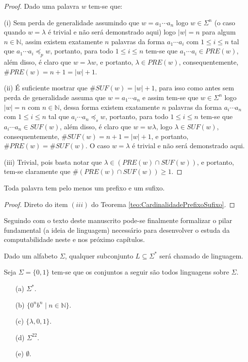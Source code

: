 \begin{proof}
	Dado uma palavra $w$ tem-se que:
	\item[(i)] Sem perda de generalidade assumindo que $w = a_1\cdots a_n$ logo $w \in \Sigma^n$ (o caso quando $w = \lambda$ é trivial e não será demonstrado aqui) logo $|w| = n$ para algum $n \in \mathbb{N}$, assim existem exatamente $n$ palavras da forma $a_1 \cdots a_i$ com $1 \leq i \leq n$ tal que $a_1 \cdots a_i \preceq_p w$, portanto, para todo $1 \leq i \leq n$ tem-se que $a_1 \cdots a_i \in PRE(w)$, além disso, é claro que $w = \lambda w$, e portanto, $\lambda \in PRE(w)$, consequentemente, $\#PRE(w) = n + 1 = |w| + 1$.
	\item[(ii)] É suficiente mostrar que $\# SUF(w) = |w| + 1$, para isso como antes sem perda de generalidade assuma que $w = a_1\cdots a_n$ e assim tem-se que $w \in \Sigma^n$ logo $|w| = n$ com $n \in \mathbb{N}$, dessa forma existem exatamente $n$ palavras da forma $a_i \cdots a_n$ com $1 \leq i \leq n$ tal que $a_i \cdots a_n \preceq_s w$, portanto, para todo $1 \leq i \leq n$ tem-se que $a_i \cdots a_n \in SUF(w)$, além disso, é claro que $w = w\lambda$, logo $\lambda \in SUF(w)$, consequentemente, $\#SUF(w) = n + 1 = |w| + 1$, e portanto, $\#PRE(w) = \#SUF(w)$. O caso $w = \lambda$ é trivial e não será demonstrado aqui.
	\item[(iii)] Trivial, pois basta notar que $\lambda \in (PRE(w) \cap SUF(w))$, e portanto, tem-se claramente que $\#(PRE(w) \cap SUF(w)) \geq 1$.
\end{proof}

\begin{corollary}
	Toda palavra tem pelo menos um prefixo e um sufixo.
\end{corollary}

\begin{proof}
	Direto do item $(iii)$ do Teorema \ref{teo:CardinalidadePrefixoSufixo}.
\end{proof}

Seguindo com o texto deste manuscrito pode-se finalmente formalizar o pilar fundamental (a ideia de linguagem) necessário para desenvolver o estuda da computabilidade neste e nos próximo capítulos.

\begin{definition}[Linguagem]\label{def:Linguagem}
	Dado um alfabeto $\Sigma$, qualquer subconjunto $L \subseteq \Sigma^*$ será chamado de linguagem.
\end{definition}

\begin{exem}
	Seja $\Sigma = \{0, 1\}$ tem-se que os conjuntos a seguir são todos linguagens sobre $\Sigma$.
	\begin{itemize}
		\item[(a)] $\Sigma^*$.
		\item[(b)] $\{0^nb^n \mid n \in \mathbb{N}\}$.
		\item[(c)] $\{\lambda, 0, 1\}$.
		\item[(d)] $\Sigma^{22}$.
		\item[(e)] $\emptyset$.
	\end{itemize}
\end{exem}

